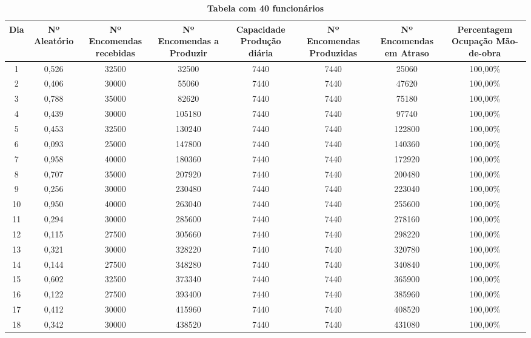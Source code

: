 \documentclass[11pt,a4paper]{report}
\begin{document}
\begin{table} [h]
\begin{center}
\caption{\bf Tabela com 40 funcionários}
\begin{adjustbox}{max width=0.9\textwidth,max totalheight=\textheight,keepaspectratio}
\begin{tabular} {|c|c|c|c|c|c|c|c|}
\hline
Dia	& Nº Aleatório & Nº Encomendas recebidas &	Nº Encomendas a Produzir &	Capacidade Produção diária &	Nº Encomendas Produzidas &	Nº Encomendas em Atraso &	Percentagem Ocupação Mão-de-obra \\ 
\hline 
1 &	0,526 &	32500 &	32500 &	7440 &	7440 &	25060 &	100,00\% \\ 
\hline 
2 &	0,406 &	30000 &	55060 &	7440 &	7440 &	47620 &	100,00\%\\ 
\hline 
3 &	0,788 &	35000 &	82620 &	7440 &	7440 &	75180 &	100,00\%\\ 
\hline 
4 &	0,439 &	30000 &	105180 &	7440 &	7440 &	97740 &	100,00\%\\ 
\hline 
5 &	0,453 &	32500 &	130240 &	7440 &	7440 &	122800 &	100,00\%\\ 
\hline 
6 &	0,093 &	25000 &	147800 &	7440 &	7440 &	140360 &	100,00\%\\ 
\hline 
7 &	0,958 &	40000 &	180360 &	7440 &	7440 &	172920 &	100,00\%\\ 
\hline 
8 &	0,707 &	35000 &	207920 &	7440 &	7440 &	200480 &	100,00\%\\ 
\hline 
9 &	0,256 &	30000 &	230480 &	7440 &	7440 &	223040 &	100,00\%\\ 
\hline 
10 &	0,950 &	40000 &	263040 &	7440 &	7440 &	255600 &	100,00\%\\ 
\hline 
11 &	0,294 &	30000 &	285600 &	7440 &	7440 &	278160 &	100,00\%\\ 
\hline 
12 &	0,115 &	27500 &	305660 &	7440 &	7440 &	298220 &	100,00\%\\ 
\hline 
13 &	0,321 &	30000 &	328220 &	7440 &	7440 &	320780 &	100,00\%\\ 
\hline 
14 &	0,144 &	27500 &	348280 &	7440 &	7440 &	340840 &	100,00\%\\ 
\hline 
15 &	0,602 &	32500 &	373340 &	7440 &	7440 &	365900 &	100,00\%\\ 
\hline 
16 &	0,122 &	27500 &	393400 &	7440 &	7440 &	385960 &	100,00\%\\ 
\hline 
17 &	0,412 &	30000 &	415960 &	7440 &	7440 &	408520 &	100,00\%\\ 
\hline 
18 &	0,342 &	30000 &	438520 &	7440 &	7440 &	431080 &	100,00\%\\ 

\end{tabular}
\end{adjustbox}
\end{center}
\end{table}
\end{document}
